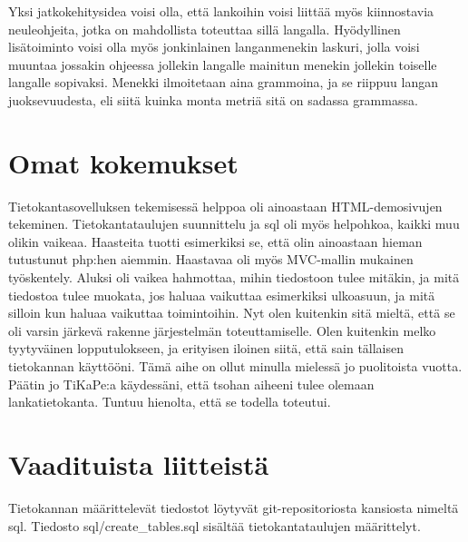 \documentclass[12pt]{article}
\begin{document}
Yksi jatkokehitysidea voisi olla, että lankoihin voisi liittää myös kiinnostavia neuleohjeita, jotka on mahdollista toteuttaa sillä langalla. Hyödyllinen lisätoiminto voisi olla myös jonkinlainen langanmenekin laskuri, jolla voisi muuntaa jossakin ohjeessa jollekin langalle mainitun menekin jollekin toiselle langalle sopivaksi. Menekki ilmoitetaan aina grammoina, ja se riippuu langan juoksevuudesta, eli siitä kuinka monta metriä sitä on sadassa grammassa. 
\section{Omat kokemukset}
Tietokantasovelluksen tekemisessä helppoa oli ainoastaan HTML-demosivujen tekeminen. Tietokantataulujen suunnittelu ja sql oli myös helpohkoa, kaikki muu olikin vaikeaa. Haasteita tuotti esimerkiksi se, että olin ainoastaan hieman tutustunut php:hen aiemmin. Haastavaa oli myös MVC-mallin mukainen työskentely. Aluksi oli vaikea hahmottaa, mihin tiedostoon tulee mitäkin, ja mitä tiedostoa tulee muokata, jos haluaa vaikuttaa esimerkiksi ulkoasuun, ja mitä silloin kun haluaa vaikuttaa toimintoihin. Nyt olen kuitenkin sitä mieltä, että se oli varsin järkevä rakenne järjestelmän toteuttamiselle. Olen kuitenkin melko tyytyväinen lopputulokseen, ja erityisen iloinen siitä, että sain tällaisen tietokannan käyttööni. Tämä aihe on ollut minulla mielessä jo puolitoista vuotta. Päätin jo TiKaPe:a käydessäni, että tsohan aiheeni tulee olemaan lankatietokanta. Tuntuu hienolta, että se todella toteutui. 
\section{Vaadituista liitteistä}
Tietokannan määrittelevät tiedostot löytyvät git-repositoriosta kansiosta nimeltä sql. Tiedosto sql/create\_tables.sql sisältää tietokantataulujen määrittelyt. 
\end{document}
